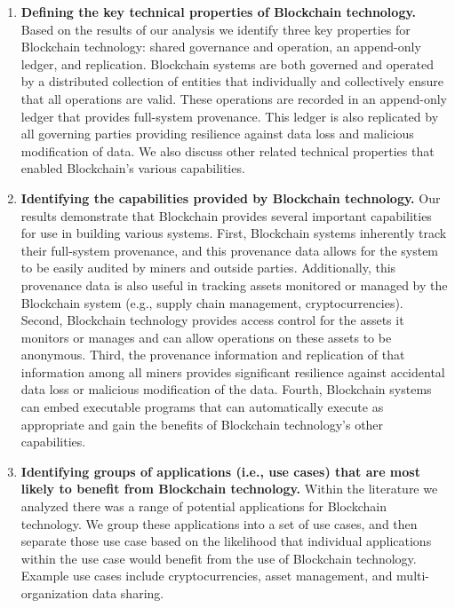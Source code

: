 \begin{enumerate}
	\item \textbf{Defining the key technical properties of Blockchain technology.}
	Based on the results of our analysis we identify three key properties for Blockchain technology: shared governance and operation, an append-only ledger, and replication.
	Blockchain systems are both governed and operated by a distributed collection of entities that individually and collectively ensure that all operations are valid.
	These operations are recorded in an append-only ledger that provides full-system provenance.
	This ledger is also replicated by all governing parties providing resilience against data loss and malicious modification of data.
	We also discuss other related technical properties that enabled Blockchain's various capabilities.
	
	\item \textbf{Identifying the capabilities provided by Blockchain technology.}
	Our results demonstrate that Blockchain provides several important capabilities for use in building various systems.
	First, Blockchain systems inherently track their full-system provenance, and this provenance data allows for the system to be easily audited by miners and outside parties.
	Additionally, this provenance data is also useful in tracking assets monitored or managed by the Blockchain system (e.g., supply chain management, cryptocurrencies).
	Second, Blockchain technology provides access control for the assets it monitors or manages and can allow operations on these assets to be anonymous.
	Third, the provenance information and replication of that information among all miners provides significant resilience against accidental data loss or malicious modification of the data.
	Fourth, Blockchain systems can embed executable programs that can automatically execute as appropriate and gain the benefits of Blockchain technology's other capabilities.
	
	\item \textbf{Identifying groups of applications (i.e., use cases) that are most likely to benefit from Blockchain technology.}
	Within the literature we analyzed there was a range of potential applications for Blockchain technology.
	We group these applications into a set of use cases, and then separate those use case based on the likelihood that individual applications within the use case would benefit from the use of Blockchain technology.
	Example use cases include cryptocurrencies, asset management, and multi-organization data sharing.
	

\end{enumerate}
